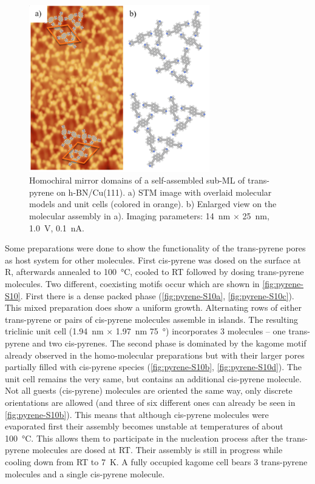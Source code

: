 \begin{figure}[]\centering
	\includegraphics[width=0.7\textwidth]{./images/paper/pyrene/figure-S9}
	\caption{Homochiral mirror domains of a self-assembled sub-ML of trans-pyrene on h-BN/Cu(111). a) STM image with overlaid molecular models and unit cells (colored in orange). b) Enlarged view on the molecular assembly in a). Imaging parameters: \SI{14}{\nano \meter} $\times$ \SI{25}{\nano \meter}, \SI{1.0}{\volt}, \SI{0.1}{\nano \ampere}.
	}
	\label{fig:pyene-S9}
\end{figure}

Some preparations were done to show the functionality of the trans-pyrene pores as host system for other molecules. First cis-pyrene was dosed on the surface at R, afterwards annealed to \SI{100}{\celsius}, cooled to RT followed by dosing trans-pyrene molecules. Two different, coexisting motifs occur which are shown in \autoref{fig:pyrene-S10}. First there is a dense packed phase (\autoref{fig:pyrene-S10a}, \autoref{fig:pyrene-S10c}). This mixed preparation does show a uniform growth. Alternating rows of either trans-pyrene or pairs of cis-pyrene molecules assemble in islands. The resulting triclinic unit cell (\SI{1.94}{\nano \meter} $\times$ \SI{1.97}{\nano \meter} \SI{75}{\degree}) incorporates 3 molecules – one trans-pyrene and two cis-pyrenes. The second phase is dominated by the kagome motif already observed in the homo-molecular preparations but with their larger pores partially filled with cis-pyrene species (\autoref{fig:pyrene-S10b}, \autoref{fig:pyrene-S10d}). The unit cell remains the very same, but contains an additional cis-pyrene molecule. Not all guests (cis-pyrene) molecules are oriented the same way, only discrete orientations are allowed (and three of six different ones can already be seen in \autoref{fig:pyrene-S10b}). This means that although cis-pyrene molecules were evaporated first their assembly becomes unstable at temperatures of about \SI{100}{\celsius}. This allows them to participate in the nucleation process after the trans-pyrene molecules are dosed at RT. Their assembly is still in progress while cooling down from RT to \SI{7}{\kelvin}. A fully occupied kagome cell bears 3 trans-pyrene molecules and a single cis-pyrene molecule.


